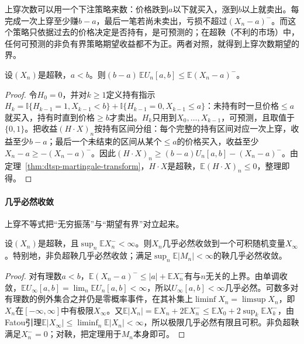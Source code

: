 上穿次数可以用一个下注策略来数：价格跌到$a$以下就买入，涨到$b$以上就卖出。每完成一次上穿至少赚$b-a$，最后一笔若尚未卖出，亏损不超过$(X_n-a)^-$。而这个策略只依据过去的价格决定是否持有，是可预测的；在超鞅（不利的市场）中，任何可预测的非负有界策略期望收益都不为正。两者对照，就得到上穿次数期望的界。

\begin{theorem}[Doob上穿不等式]
  \label{thm:dtsp-upcrossing}
  设$(X_n)$是超鞅，$a<b$。则$(b-a)\,\mathbb EU_n[a,b]\leq\mathbb E(X_n-a)^-$。
\end{theorem}

\begin{proof}
令$H_0=0$，并对$k\geq1$定义持有指示$H_k=\mathbb I\{H_{k-1}=1,X_{k-1}<b\}+\mathbb I\{H_{k-1}=0,X_{k-1}\leq a\}$：未持有时一旦价格$\leq a$就买入，持有时直到价格$\geq b$才卖出。$H_k$只用到$X_0,\ldots,X_{k-1}$，可预测，且取值于$\{0,1\}$。把收益$(H\cdot X)_n$按持有区间分组：每个完整的持有区间对应一次上穿，收益至少$b-a$；最后一个未结束的区间从某个$\leq a$的价格买入，收益至少$X_n-a\geq-(X_n-a)^-$。因此$(H\cdot X)_n\geq(b-a)U_n[a,b]-(X_n-a)^-$。由定理~\ref{thm:dtsp-martingale-transform}，$H\cdot X$是超鞅，$\mathbb E(H\cdot X)_n\leq0$，整理即得。
\end{proof}

\paragraph{几乎必然收敛}
上穿不等式把“无穷振荡”与“期望有界”对立起来。

\begin{theorem}[超鞅收敛定理]
  \label{thm:dtsp-supermartingale-convergence}
  设$(X_n)$是超鞅，且$\sup_n\mathbb EX_n^-<\infty$。则$X_n$几乎必然收敛到一个可积随机变量$X_\infty$。特别地，非负超鞅几乎必然收敛；满足$\sup_n\mathbb E|M_n|<\infty$的鞅几乎必然收敛。
\end{theorem}

\begin{proof}
对有理数$a<b$，$\mathbb E(X_n-a)^-\leq|a|+\mathbb EX_n^-$有与$n$无关的上界。由单调收敛，$\mathbb EU_\infty[a,b]=\lim_n\mathbb EU_n[a,b]<\infty$，所以$U_\infty[a,b]<\infty$几乎必然。可数多对有理数的例外集合之并仍是零概率事件，在其补集上$\liminf X_n=\limsup X_n$，即$X_n$在$[-\infty,\infty]$中有极限$X_\infty$。又$\mathbb E|X_n|=\mathbb EX_n+2\mathbb EX_n^-\leq\mathbb EX_0+2\sup_k\mathbb EX_k^-$，由Fatou引理$\mathbb E|X_\infty|\leq\liminf_n\mathbb E|X_n|<\infty$，所以极限几乎必然有限且可积。非负超鞅满足$X_n^-=0$；对鞅，把定理用于$M_n$本身即可。
\end{proof}

